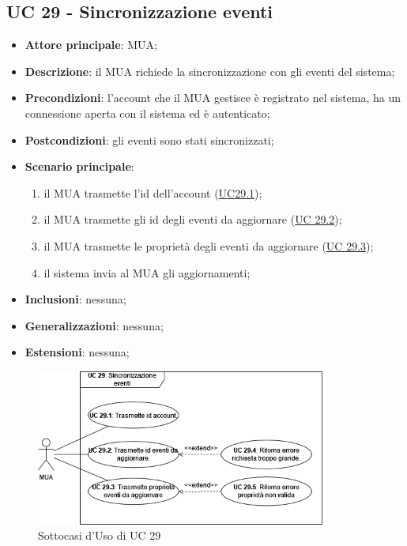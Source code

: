 
\subsection{UC 29 - Sincronizzazione eventi} \label{sec:UC29}
    
    \begin{itemize}
        \item \textbf{Attore principale}: MUA;
        \item \textbf{Descrizione}: il MUA richiede la sincronizzazione con gli eventi del sistema;
        \item \textbf{Precondizioni}: l’account che il MUA gestisce è registrato nel sistema, ha un connessione aperta con il sistema ed è autenticato;
        \item \textbf{Postcondizioni}: gli eventi sono stati sincronizzati;
        \item \textbf{Scenario principale}:
            \begin{enumerate}
                \item il MUA trasmette l'id dell'account (\hyperref[sec:UC29.1]{UC29.1});
                \item il MUA trasmette gli id degli eventi da aggiornare (\hyperref[sec:UC29.2]{UC 29.2});
                \item il MUA trasmette le proprietà degli eventi da aggiornare (\hyperref[sec:UC29.3]{UC 29.3});
                \item il sistema invia al MUA gli aggiornamenti;
            \end{enumerate}
        \item \textbf{Inclusioni}: nessuna;
        \item \textbf{Generalizzazioni}: nessuna;
        \item \textbf{Estensioni}: nessuna;
    \end{itemize}

    \begin{figure}[H]
        \includegraphics[width=0.85\textwidth]{sections/uc_imgs/UC29.png}
        \centering
        \caption{Sottocasi d'Uso di UC 29}
    \end{figure}

